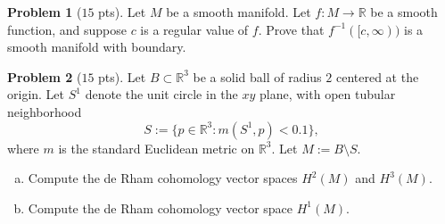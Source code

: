 \documentclass{amsart}
\newcommand{\+}[1]{\ensuremath{\mathbf{#1}}}
\newcommand{\R}{{\mathbb R}}
\theoremstyle{definition}
\newtheorem{prob}{Problem}
\begin{document}
\begin{prob}[$15$ pts]
Let $M$ be a smooth manifold.  Let $f: M \to \R$ be a smooth function, and
suppose $c$ is a regular value of $f$.
Prove that $f^{-1}([c,\infty))$ is a smooth manifold with boundary. 
\end{prob}










\begin{prob}[$15$ pts]
Let $B \subset \R^3$ be a solid ball of radius $2$ centered at the origin.  Let $S^1$ denote
the unit circle in the $xy$ plane, with open tubular neighborhood
\[S := \{p \in \R^3: m(S^1, p) < 0.1 \},\]
where $m$ is the standard Euclidean metric on $\R^3$.
Let $M := B \setminus S$.
\begin{enumerate}[(a)]
 \item Compute the de Rham cohomology vector spaces $H^2(M)$ and $H^3(M)$.
 \item Compute the de Rham cohomology vector space $H^1(M)$.
\end{enumerate}
\end{prob}







\end{document}
